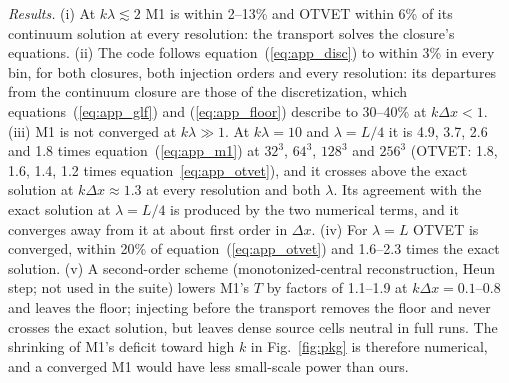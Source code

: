 \emph{Results.} (i) At $k\lambda\lesssim2$ M1 is within 2--13\% and OTVET within 6\% of its continuum
solution at every resolution: the transport solves the closure's equations. (ii) The code follows equation~(\ref{eq:app_disc}) to within 3\% in every bin, for both closures, both
injection orders and every resolution: its departures from the continuum closure are those of the
discretization, which equations~(\ref{eq:app_glf}) and (\ref{eq:app_floor}) describe to 30--40\% at
$k\Delta x<1$. (iii) M1 is not converged at $k\lambda\gg1$. At
$k\lambda=10$ and $\lambda=L/4$ it is 4.9, 3.7, 2.6 and 1.8 times equation~(\ref{eq:app_m1}) at $32^3$,
$64^3$, $128^3$ and $256^3$ (OTVET: 1.8, 1.6, 1.4, 1.2 times equation~\ref{eq:app_otvet}), and it crosses
above the exact solution at $k\Delta x\approx1.3$ at every resolution and both $\lambda$. Its agreement with
the exact solution at $\lambda=L/4$ is produced by the two numerical terms, and it converges away from it
at about first order in $\Delta x$. (iv) For $\lambda=L$ OTVET is converged, within 20\% of
equation~(\ref{eq:app_otvet}) and 1.6--2.3 times the exact solution. (v) A second-order scheme
(monotonized-central reconstruction, Heun step; not used in the suite) lowers M1's $T$ by factors of
1.1--1.9 at $k\Delta x=0.1$--0.8 and leaves the floor; injecting before the transport removes the floor and
never crosses the exact solution, but leaves dense source cells neutral in full runs. The shrinking of M1's
deficit toward high $k$ in Fig.~\ref{fig:pkg} is therefore numerical, and a converged M1 would have
less small-scale power than ours.

